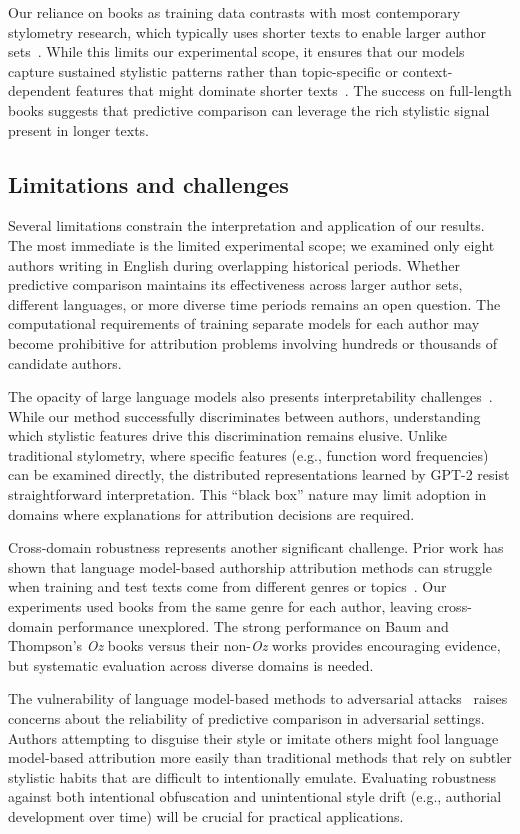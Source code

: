\documentclass{llmxive}
\begin{document}
Our reliance on books as training data contrasts with most contemporary
stylometry research, which typically uses shorter texts to enable larger author
sets~\citep{TyoEtal22}. While this limits our experimental scope, it ensures
that our models capture sustained stylistic patterns rather than
topic-specific or context-dependent features that might dominate shorter
texts~\citep{FincBosc24}. The success on full-length books suggests that
predictive comparison can leverage the rich stylistic signal present in
longer texts.

\subsection{Limitations and challenges}

Several limitations constrain the interpretation and application of our results.
The most immediate is the limited experimental scope; we examined only eight
authors writing in English during overlapping historical periods. Whether
predictive comparison maintains its effectiveness across larger author sets,
different languages, or more diverse time periods remains an open question.
The computational requirements of training separate models for each author may
become prohibitive for attribution problems involving hundreds or thousands of
candidate authors.

The opacity of large language models also presents interpretability
challenges~\citep{SchuEtal20}. While our method successfully discriminates
between authors, understanding which stylistic features drive this
discrimination remains elusive. Unlike traditional stylometry, where specific
features (e.g., function word frequencies) can be examined directly, the
distributed representations learned by GPT-2 resist straightforward
interpretation. This ``black box'' nature may limit adoption in domains where
explanations for attribution decisions are required.

Cross-domain robustness represents another significant challenge. Prior work
has shown that language model-based authorship attribution methods can struggle
when training and test texts come from different genres or
topics~\citep{BarlStam20}. Our experiments used books from the same genre for
each author, leaving cross-domain performance unexplored. The strong
performance on Baum and Thompson's \emph{Oz} books versus their non-\emph{Oz}
works provides encouraging evidence, but systematic evaluation across diverse
domains is needed.

The vulnerability of language model-based methods to adversarial
attacks~\citep{QuirMaie19} raises concerns about the reliability of predictive
comparison in adversarial settings. Authors attempting to disguise their style
or imitate others might fool language model-based attribution more easily than
traditional methods that rely on subtler stylistic habits that are difficult to
intentionally emulate. Evaluating robustness against both intentional
obfuscation and unintentional style drift (e.g., authorial development over
time) will be crucial for practical applications.
\end{document}
